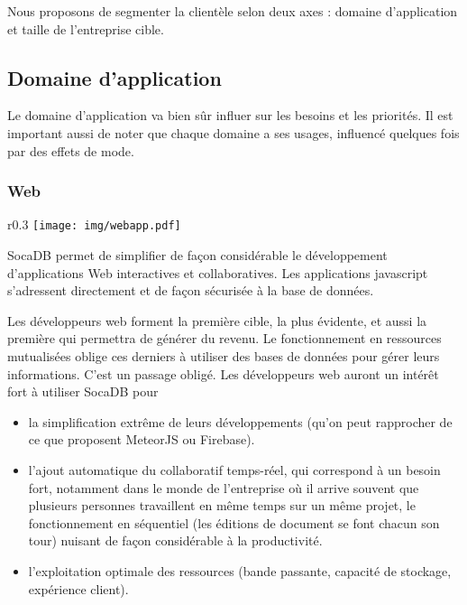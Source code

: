 \documentclass[a4paper,10pt]{scrreprt}
\begin{document}
        \medskip
        Nous proposons de segmenter la clientèle selon deux axes : domaine d'application et taille de l'entreprise cible.
            
        \subsection{Domaine d'application}

            Le domaine d'application va bien sûr influer sur les besoins et les priorités. Il est important aussi de noter que chaque domaine a ses usages, influencé quelques fois par des effets de mode.
            
            \subsubsection{Web}

                \begin{wrapfigure}{r}{0.3\textwidth}
                    \hfill
                    \vspace{-0.9em}
                    \texttt{[image: img/webapp.pdf]}
                    \begin{center}
                    \begin{scriptsize}
                        SocaDB permet de simplifier de façon considérable le développement d'applications Web interactives et collaboratives. Les applications javascript s'adressent directement et de façon sécurisée à la base de données.
                    \end{scriptsize}
                    \end{center}
                \end{wrapfigure}

                Les développeurs web forment la première cible, la plus évidente, et aussi la première qui permettra de générer du revenu. Le fonctionnement en ressources mutualisées oblige ces derniers à utiliser des bases de données pour gérer leurs informations. C'est un passage obligé. Les développeurs web auront un intérêt fort à utiliser SocaDB pour
                \begin{itemize}
                    \item la simplification extrême de leurs développements (qu'on peut rapprocher de ce que proposent MeteorJS ou Firebase). %
                    \item l'ajout automatique du collaboratif temps-réel, qui correspond à un besoin fort, notamment dans le monde de l'entreprise où il arrive souvent que plusieurs personnes travaillent en même temps sur un même projet, le fonctionnement en séquentiel (les éditions de document se font chacun son tour) nuisant de façon considérable à la productivité.
                    \item l'exploitation optimale des ressources (bande passante, capacité de stockage, expérience client).
                \end{itemize}
                
\end{document}

